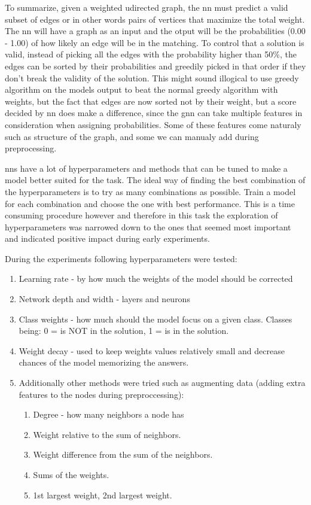 To summarize, given a weighted udirected graph, the \gls{nn} must predict  a valid subset of edges or in other words pairs of vertices that maximize the total weight. The \gls{nn} will have a graph as an input and the otput will be the probabilities (0.00 - 1.00) of how likely an edge will be in the matching. To control that a solution is valid, instead of picking all the edges with the probability higher than 50\%, the edges can be sorted by their probabilities and greedily picked in that order if they don't break the validity of the solution. This might sound illogical to use greedy algorithm on the models output to beat the normal greedy algorithm with weights, but the fact that edges are now sorted not by their weight, but a score decided by \gls{nn} does make a difference, since the \gls{gnn} can take multiple features in consideration when assigning probabilities. Some of these features come naturaly such as structure of the graph, and some we can manualy add during preprocessing. 

\gls{nn}s have a lot of hyperparameters and methods that can be tuned to make a model better suited for the task. The ideal way of finding the best combination of the hyperparameters is to try as many combinations as possible. Train a model for each combination and choose the one with best performance. This is a time consuming procedure however and therefore in this task the exploration of hyperparameters was narrowed down to the ones that seemed most important and indicated positive impact during early experiments. 

During the experiments following hyperparameters were tested:
\begin{enumerate}
\item Learning rate - by how much the weights of the model should be corrected
\item Network depth and width - layers and neurons
\item Class weights - how much should the model focus on a given class. Classes being: 0 = is NOT in the solution, 1 = is in the solution.
\item Weight decay - used to keep weights values relatively small and decrease chances of the model memorizing the answers. 

\item Additionally other methods were tried such as augmenting data (adding extra features to the nodes during preproccessing): 
	\begin{enumerate}
	\item Degree - how many neighbors a node has
	\item Weight relative to the sum of neighbors.
	\item Weight difference from the sum of the neighbors.
	\item Sums of the weights. 
	\item 1st largest weight, 2nd largest weight.
	\end{enumerate}

\end{enumerate}

